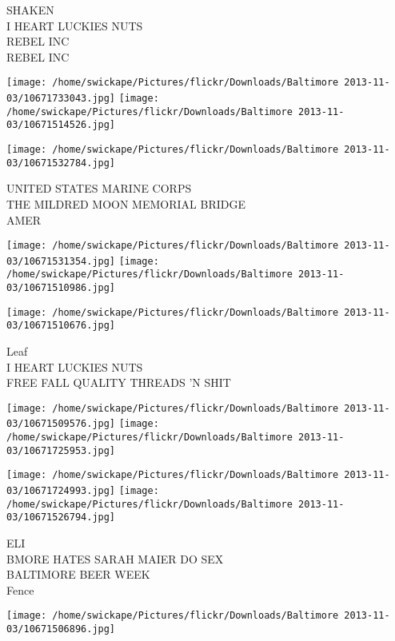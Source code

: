 \documentclass[10pt,letterpaper]{article}
\begin{document}
SHAKEN\\
I HEART LUCKIES NUTS\\
REBEL INC\\
REBEL INC\\
\pagebreak

\texttt{[image: /home/swickape/Pictures/flickr/Downloads/Baltimore 2013-11-03/10671733043.jpg]}
\texttt{[image: /home/swickape/Pictures/flickr/Downloads/Baltimore 2013-11-03/10671514526.jpg]}

\vspace{0.25in}
\texttt{[image: /home/swickape/Pictures/flickr/Downloads/Baltimore 2013-11-03/10671532784.jpg]}

UNITED STATES MARINE CORPS\\
THE MILDRED MOON MEMORIAL BRIDGE\\
AMER\\
\pagebreak

\texttt{[image: /home/swickape/Pictures/flickr/Downloads/Baltimore 2013-11-03/10671531354.jpg]}
\texttt{[image: /home/swickape/Pictures/flickr/Downloads/Baltimore 2013-11-03/10671510986.jpg]}

\vspace{0.25in}
\texttt{[image: /home/swickape/Pictures/flickr/Downloads/Baltimore 2013-11-03/10671510676.jpg]}

Leaf\\
I HEART LUCKIES NUTS\\
FREE FALL QUALITY THREADS 'N SHIT\\
\pagebreak

\texttt{[image: /home/swickape/Pictures/flickr/Downloads/Baltimore 2013-11-03/10671509576.jpg]}
\texttt{[image: /home/swickape/Pictures/flickr/Downloads/Baltimore 2013-11-03/10671725953.jpg]}

\texttt{[image: /home/swickape/Pictures/flickr/Downloads/Baltimore 2013-11-03/10671724993.jpg]}
\texttt{[image: /home/swickape/Pictures/flickr/Downloads/Baltimore 2013-11-03/10671526794.jpg]}

ELI\\
BMORE HATES SARAH MAIER DO SEX\\
BALTIMORE BEER WEEK\\
Fence\\
\pagebreak

\texttt{[image: /home/swickape/Pictures/flickr/Downloads/Baltimore 2013-11-03/10671506896.jpg]}
\end{document}
